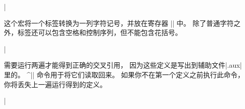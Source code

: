 {{\csdisplay
\newif\ifxrefwarning  \xrefwarningtrue
\def\xrdef#1{\begingroup
   \xrlabel{#1}%
   \edef\@wr{\@writexrdef{\the\@xrlabeltoks}}%
   \@wr
   \endgroup \ignorespaces}%
\def\@writexrdef#1{\write\reffile{%
     \string\gdef
        \expandafter\string\csname#1\endcsname
        {\noexpand\folio}\percentchar}}%
\def\xrefnumber#1{%
   \xrlabel{#1}%
   \toks0 =
      \expandafter{\csname\the\@xrlabeltoks\endcsname}%
   \expandafter \ifx\the\toks0\relax
      \ifxrefwarning \message{Undefined label
         `\tokstostring{#1}'.}\fi
      {\let\spacesub = \space
       \expandafter\xdef\the\toks0
          {`{\tt \tokstostring{#1}}'}}\fi
   \the\toks0}%
\def\xref#1{p.\thinspace\xrefnumber{#1}}%
\def\xrefn#1{\xrefnumber{#1}}%
|

这个宏将一个标签转换为一列字符记号，并放在寄存器 || 中。
除了普通字符之外，标签还可以包含空格和控制序列，但不能包含花括号。

\csdisplay
\newtoks\@xrlabeltoks
\def\xrlabel#1{\begingroup
      \escapechar = `\_ \edef\tts{\tokstostring{#1_}}%
      \global\@xrlabeltoks = \expandafter{\tts}%
   \endgroup}%
|

需要运行两遍才能得到正确的交叉引用，
因为这些定义是写出到辅助文件|\jobname.aux| 里的。
\pix^|\readreffile| 命令用于将它们读取回来。
如果你不在第一个定义之前执行此命令，你将丢失上一遍运行得到的定义。

\csdisplay
\newwrite{} \newif\ifreffileopened
\def\openreffile{\ifreffileopened\else
      \reffileopenedtrue
      \immediate\openout\reffile = \jobname.aux
   \fi}%
\def\readreffile{%
   \testfileexistence{aux}%
   \iffileexists
      \begingroup
         \@setletters
          \jobname.aux
      \endgroup
   \else
      \message{No cross-reference file; I won't give you
         warnings about undefined labels.}%
      \xrefwarningfalse
   \fi
   \openreffile}%
\def\@setletters{%
   \catcode`_ = \letter \catcode`+ = \letter
   \catcode`- = \letter \catcode`@ = \letter
   \catcode`0 = \letter \catcode`1 = \letter
   \catcode`2 = \letter \catcode`3 = \letter
   \catcode`4 = \letter \catcode`5 = \letter
   \catcode`6 = \letter \catcode`7 = \letter
   \catcode`8 = \letter \catcode`9 = \letter
   \catcode`( = \letter \catcode`) = \letter}%
|

}}
